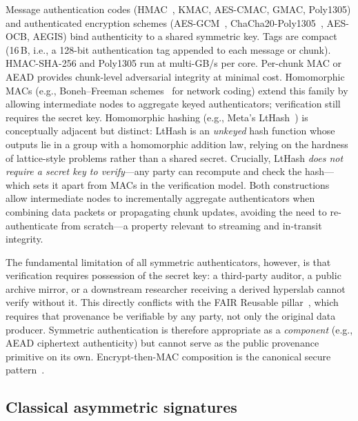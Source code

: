 \documentclass[11pt]{article}
\begin{document}
Message authentication codes (HMAC~\cite{rfc2104}, KMAC, AES-CMAC, GMAC,
Poly1305) and authenticated encryption schemes (AES-GCM~\cite{nist80038d},
ChaCha20-Poly1305~\cite{rfc8439}, AES-OCB, AEGIS) bind authenticity to a
shared symmetric key. Tags are compact (16\,B, i.e., a 128-bit authentication
tag appended to each message or chunk). HMAC-SHA-256 and Poly1305 run
at multi-GB/s per core. Per-chunk MAC or AEAD provides chunk-level adversarial
integrity at minimal cost. Homomorphic MACs (e.g., Boneh--Freeman
schemes~\cite{boneh2011homomorphicmac} for network coding) extend this family
by allowing intermediate nodes to aggregate keyed authenticators; verification
still requires the secret key.  Homomorphic hashing (e.g., Meta's
LtHash~\cite{lthash}) is conceptually adjacent but distinct: LtHash is an
\emph{unkeyed} hash function whose outputs lie in a group with a homomorphic
addition law, relying on the hardness of lattice-style problems rather than a
shared secret.  Crucially, LtHash \emph{does not require a secret key to
verify}---any party can recompute and check the hash---which sets it apart from
MACs in the verification model.  Both constructions allow intermediate nodes to
incrementally aggregate authenticators when combining data packets or
propagating chunk updates, avoiding the need to re-authenticate from
scratch---a property relevant to streaming and in-transit integrity.

The fundamental limitation of all symmetric authenticators, however, is that
verification requires possession of the secret key: a third-party auditor, a
public archive mirror, or a downstream researcher receiving a derived hyperslab
cannot verify without it. This directly conflicts with the FAIR Reusable
pillar~\cite{wilkinson2016fair}, which requires that provenance be verifiable
by any party, not only the original data producer. Symmetric authentication
is therefore appropriate as a \emph{component} (e.g., AEAD ciphertext
authenticity) but cannot serve as the public provenance primitive on its own. Encrypt-then-MAC composition is the
canonical secure pattern~\cite{bellare2000encrypt,bellare2000encryptmac}.

\subsection{Classical asymmetric signatures}
\end{document}
